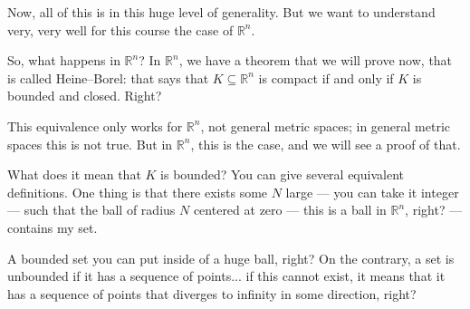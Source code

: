 \begin{speech}[00:41:13 - 00:43:13]
Now, all of this is in this huge level of generality. But we want to understand very, very well for this course the case of $\mathbb{R}^n$. 

So, what happens in $\mathbb{R}^n$? In $\mathbb{R}^n$, we have a theorem that we will prove now, that is called Heine--Borel:  that says that $K \subseteq \mathbb{R}^n$ is compact  if and only if $K$ is bounded and closed.  Right?

This equivalence only works for $\mathbb{R}^n$, not general metric spaces; in general metric spaces this is not true. But in $\mathbb{R}^n$, this is the case, and we will see a proof of that.

What does it mean that $K$ is bounded? You can give several equivalent definitions. One thing is that there exists some $N$ large  --- you can take it integer --- such that the ball of radius $N$ centered at zero  --- this is a ball in $\mathbb{R}^n$, right?  --- contains my set. 

A bounded set you can put inside of a huge ball, right? On the contrary, a set is unbounded if it has a sequence of points... if this cannot exist, it means that it has a sequence of points that diverges to infinity in some direction, right?
\end{speech}

